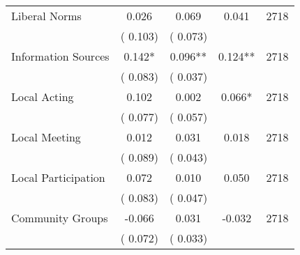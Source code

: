 \begin{tabular}{l*{4}{c}}
 Liberal Norms &              0.026 &         0.069 &           0.041 & 2718                       \\  
                 &        (       0.103)                   &        (       0.073)                        &                                                             &                                                      \\      

 Information Sources &              0.142* &         0.096** &           0.124** & 2718                       \\  
                 &        (       0.083)                   &        (       0.037)                        &                                                             &                                                      \\      

 Local Acting &              0.102 &         0.002 &           0.066* & 2718                       \\  
                 &        (       0.077)                   &        (       0.057)                        &                                                             &                                                      \\      

 Local Meeting &              0.012 &         0.031 &           0.018 & 2718                       \\  
                 &        (       0.089)                   &        (       0.043)                        &                                                             &                                                      \\      

 Local Participation &              0.072 &         0.010 &           0.050 & 2718                       \\  
                 &        (       0.083)                   &        (       0.047)                        &                                                             &                                                      \\      

 Community Groups &             -0.066 &         0.031 &          -0.032 & 2718                       \\  
                 &        (       0.072)                   &        (       0.033)                        &                                                             &                                                      \\      

\hline \end{tabular}                                                                                                              
